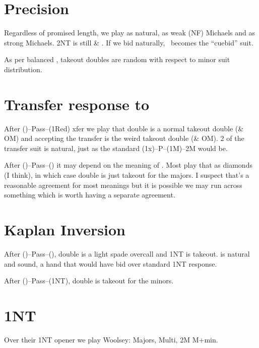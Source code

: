 \documentclass[tom-ari]{subfile}
\begin{document}
	
	\section[Precision 1D]{Precision }
	
	Regardless of promised length, we play  as natural,  as weak (NF) Michaels and  as strong Michaels. 2NT is still \heartsuit \& \clubsuit. If we bid  naturally, \clubsuit ~becomes the ``cuebid'' suit.
	
	As per balanced , takeout doubles are random with respect to minor suit distribution.
	
	\section[Transfer response to 1C]{Transfer response to }
	
	After ()--Pass--(1Red) xfer we play that double is a normal takeout double (\diamondsuit \& OM) and accepting the transfer is the weird takeout double (\clubsuit \& OM). 2 of the transfer suit is natural, just as the standard (1x)--P--(1M)--2M would be.
	
	After ()--Pass--() it may depend on the meaning of . Most play that as diamonds (I think), in which case double is just takeout for the majors. I suspect that's a reasonable agreement for most  meanings but it is possible we may run across something which is worth having a separate agreement.
	
	\section{Kaplan Inversion}
	
	After ()--Pass--(), double is a light spade overcall and 1NT is takeout.  is natural and sound, a hand that would have bid  over standard 1NT response.
	
	After ()--Pass--(1NT), double is takeout for the minors.
	
	\section{1NT}
	
	Over their 1NT opener we play Woolsey:   Majors,  Multi, 2M M+min.
	
\end{document}

